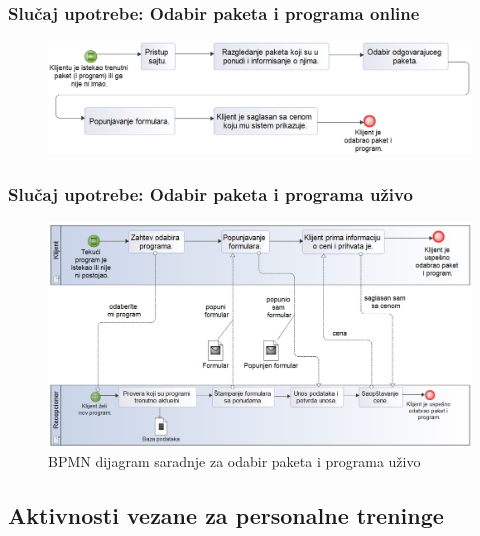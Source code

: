 \documentclass[a4paper]{article}
\begin{document}
\subsubsection{Slučaj upotrebe: Odabir paketa i programa online}

\begin{figure}[!ht]
\begin{center}
\includegraphics[scale=0.55]{sections/images/bpmn_dijagram_procesa_odabir_paketa_i_programa_online.png}
\end{center}
\label{fig:kontekst}
\end{figure}

\subsubsection{Slučaj upotrebe: Odabir paketa i programa uživo}

\begin{figure}[!ht]
\begin{center}
\includegraphics[scale=0.55]{sections/images/bpmn_dijagram_saradnje_odabir_paketa_i_programa_uzivo.png}
\end{center}
\caption{BPMN dijagram saradnje za odabir paketa i programa uživo}
\label{fig:kontekst}
\end{figure}


\newpage
\subsection{Aktivnosti vezane za personalne treninge}

\end{document}
